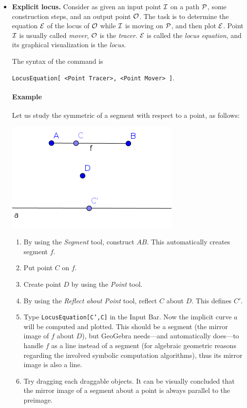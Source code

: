 \documentclass{article}
\begin{document}
\begin{itemize}
\item\textbf{Explicit locus.}
Consider as given an input point $\cal{I}$ on a path $\cal{P}$, some construction steps, and an output point $\cal O$. The task is to determine the equation $\cal E$ of the locus of $\cal O$ while $\cal I$ is moving on $\cal P$, and then plot $\cal E$. Point $\cal I$ is usually called \textit{mover}, $\cal O$ is the \textit{tracer}. $\cal E$ is called the \textit{locus equation}, and its graphical visualization is the \textit{locus}.

The syntax of the command is
\begin{center}
    \texttt{LocusEquation[ <Point Tracer>, <Point Mover> ]}.
\end{center}

\paragraph{Example}
Let us study the symmetric of a segment with respect to a point, as follows: 
\begin{center}
\includegraphics[scale=0.5]{LocusEquation-example-explicit}
\end{center}
\begin{enumerate}
    \item By using the \textit{Segment} tool, construct $AB$. This automatically creates segment $f$.
    \item Put point $C$ on $f$.
    \item Create point $D$ by using the \textit{Point} tool.
    \item By using the \textit{Reflect about Point} tool, reflect $C$ about $D$. This defines $C'$.
    \item Type \texttt{LocusEquation[C',C]} in the Input Bar. Now the implicit curve $a$ will be computed and plotted. This should be a segment (the mirror image of $f$ about $D$), but GeoGebra needs---and automatically does---to handle $f$ as a line instead of a segment (for algebraic geometric reasons regarding the involved symbolic computation algorithms), thus its mirror image is also a line.
    \item Try dragging each draggable objects. It can be visually concluded that the mirror image of a segment about a point is always parallel to the preimage.
\end{enumerate}


\end{itemize}
\end{document}
